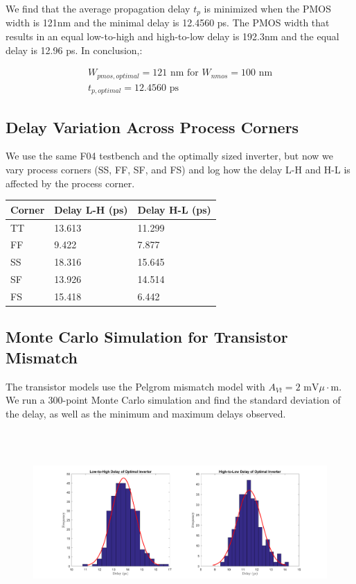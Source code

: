 \documentclass[11pt]{article}
\begin{document}
We find that the average propagation delay $t_p$ is minimized when the PMOS width is 121nm and the minimal delay is 12.4560 ps. The PMOS width that results in an equal low-to-high and high-to-low delay is 192.3nm and the equal delay is 12.96 ps. In conclusion,:

\begin{eqnarray}
W_{pmos,optimal} = 121 \text{ nm for } W_{nmos} = 100 \text{ nm} \nonumber \\
t_{p,optimal} = 12.4560 \text{ ps} \nonumber
\end{eqnarray}

\subsection{Delay Variation Across Process Corners}
We use the same F04 testbench and the optimally sized inverter, but now we vary process corners (SS, FF, SF, and FS) and log how the delay L-H and H-L is affected by the process corner.

\begin{center}
\begin{tabular}{| l | l | l |} \hline
	Corner & Delay L-H (ps) & Delay H-L (ps) \\ \hline
	TT & 13.613 & 11.299 \\ \hline
	FF & 9.422 & 7.877 \\ \hline
	SS & 18.316 & 15.645 \\ \hline
	SF & 13.926 & 14.514 \\ \hline
	FS & 15.418 & 6.442\\ \hline
\end{tabular}
\end{center}

\subsection{Monte Carlo Simulation for Transistor Mismatch}
The transistor models use the Pelgrom mismatch model with $A_{Vt} = 2 \text{ mV} \mu \cdot \text{m}$. We run a 300-point Monte Carlo simulation and find the standard deviation of the delay, as well as the minimum and maximum delays observed.

\begin{figure}[H]
	\centerline{\includegraphics[height=7cm]{images/monte_carlo_histogram.png}}
\end{figure}
\end{document}
